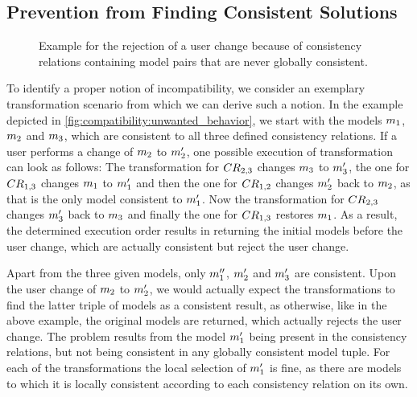 \subsection{Prevention from Finding Consistent Solutions}
\label{chap:compatibility:informal:prevention}

\begin{figure}
    \centering
    
    \caption[Example for the unwanted rejection of a user change]{Example for the rejection of a user change because of consistency relations containing model pairs that are never globally consistent.}
    \label{fig:compatibility:unwanted_behavior}
\end{figure}

To identify a proper notion of incompatibility, we consider an exemplary transformation scenario from which we can derive such a notion.
In the example depicted in \autoref{fig:compatibility:unwanted_behavior}, we start with the models $\model{m}{1}$, $\model{m}{2}$ and $\model{m}{3}$, which are consistent to all three defined consistency relations.
If a user performs a change of $\model{m}{2}$ to $\model{m}{2}'$, one possible execution of transformation can look as follows:
The transformation for $\consistencyrelation{CR}{2,3}$ changes $\model{m}{3}$ to $\model{m}{3}'$, the one for $\consistencyrelation{CR}{1,3}$ changes $\model{m}{1}$ to $\model{m}{1}'$ and then the one for $\consistencyrelation{CR}{1,2}$ changes $\model{m}{2}'$ back to $\model{m}{2}$, as that is the only model consistent to $\model{m}{1}'$.
Now the transformation for $\consistencyrelation{CR}{2,3}$ changes $\model{m}{3}'$ back to $\model{m}{3}$ and finally the one for $\consistencyrelation{CR}{1,3}$ restores $\model{m}{1}$.
As a result, the determined execution order results in returning the initial models before the user change, which are actually consistent but reject the user change.

Apart from the three given models, only $\model{m}{1}''$, $\model{m}{2}'$ and $\model{m}{3}'$ are consistent.
Upon the user change of $\model{m}{2}$ to $\model{m}{2}'$, we would actually expect the transformations to find the latter triple of models as a consistent result, as otherwise, like in the above example, the original models are returned, which actually rejects the user change.
The problem results from the model $\model{m}{1}'$ being present in the consistency relations, but not being consistent in any globally consistent model tuple.
For each of the transformations the local selection of $\model{m}{1}'$ is fine, as there are models to which it is locally consistent according to each consistency relation on its own.

